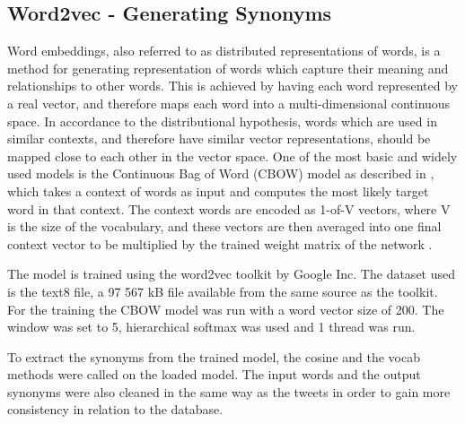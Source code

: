 





\subsection{Word2vec - Generating Synonyms}
Word embeddings, also referred to as distributed representations of words, is a method for generating representation of words which capture their meaning and relationships to other words. This is achieved by having each word represented by a real vector, and therefore maps each word into a multi-dimensional continuous space. In accordance to the distributional hypothesis, words which are used in similar contexts, and therefore have similar vector representations, should be mapped close to each other in the vector space. One of the most basic and widely used models is the Continuous Bag of Word (CBOW) model as described in \cite{wordRep}, which takes a context of words as input and computes the most likely target word in that context. The context words are encoded as 1-of-V vectors, where V is the size of the vocabulary, and these vectors are then averaged into one final context vector to be multiplied by the trained weight matrix of the network \cite{wordRep}.


The model is trained using the word2vec toolkit by Google Inc. The dataset used is the text8 file, a 97 567 kB file available from the same source as the toolkit. For the training the CBOW model was run with a word vector size of 200. The window was set to 5, hierarchical softmax was used and 1 thread was run.

To extract the synonyms from the trained model, the cosine and the vocab methods were called on the loaded model. The input words and the output synonyms were also cleaned in the same way as the tweets in order to gain more consistency in relation to the database.

